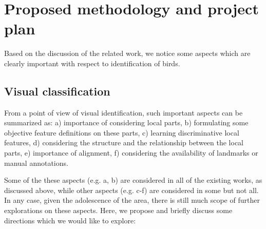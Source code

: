 \documentclass{article}
\begin{document}
\section{Proposed methodology and project plan}

Based on the discussion of the related work, we notice some aspects which are
clearly important with respect to identification of birds.

\subsection{Visual classification}
\label{subsec:visual}

From a point of view of visual identification, such important aspects can be summarized as: a)
importance of considering local parts, b) formulating some objective feature
definitions on these parts, c) learning discriminative local features, d)
considering the structure and the relationship between the local parts, e)
importance of alignment, f) considering the availability of landmarks or manual
annotations. 

Some of the these aspects (e.g. a, b) are considered  in all of the existing
works, as discussed above, while other aspects (e.g. c-f)  are considered in
some but not all. In any case, given the adolescence of the area, there is still
much scope of further explorations on these aspects. Here, we propose and
briefly discuss some directions which we would like to explore: 
\end{document}
